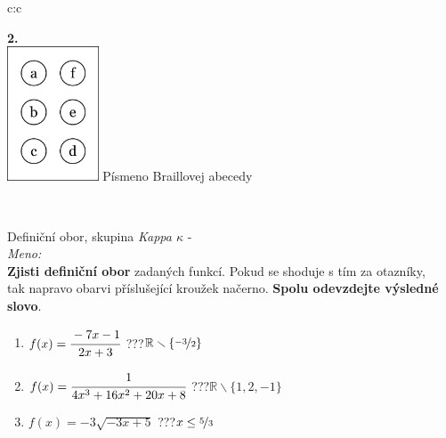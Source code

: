 \documentclass[10pt]{report}
\begin{document}
\begin{tabular}{c:c}
\begin{minipage}[c][99mm][t]{0.49\linewidth}
\begin{center}
\begin{minipage}{0.77\linewidth}
\begin{center}
\begin{varwidth}{\textwidth}
\begin{enumerate}
\end{enumerate}
\end{varwidth}
\end{center}
\end{minipage}
\begin{minipage}{0.20\linewidth}
\begin{center}
{\Huge\bfseries 2.} \\[2mm]
\includegraphics[height=40mm]{../images/braille.png}
{\small Písmeno Braillovej abecedy}
\end{center}
\end{minipage}
\end{center}
\end{minipage}
\\ \hdashline
\begin{minipage}[c][99mm][t]{0.49\linewidth}
\begin{center}
\vspace{7mm}
{\huge Definiční obor, skupina \textit{Kappa $\kappa$} -}\\[4.5mm]
\textit{Meno:}\phantom{xxxxxxxxxxxxxxxxxxxxxxxxxxxxxxxxxxxxxxxxxxxxxxxxxxxxxxxxxxxxxxxxx}\\[3.5mm]
\textbf{Zjisti definiční obor} zadaných funkcí. Pokud se shoduje s tím za otazníky,\\tak napravo obarvi příslušející kroužek načerno. \textbf{Spolu odevzdejte výsledné slovo}.\\[3mm]
\begin{minipage}{0.77\linewidth}
\begin{center}
\begin{varwidth}{\textwidth}
\begin{enumerate}
\normalsize
\item $f(x)=\cfrac{-7x-1}{2x+3}$\quad \dotfill\; ???\;\dotfill \quad $\mathbb{R}\smallsetminus\{\nicefrac{-3}{2}\}$
\item $f(x)=\cfrac{1}{4x^3+16x^2+20x+8}$\quad \dotfill\; ???\;\dotfill \quad $\mathbb{R}\smallsetminus\{1,2,-1\}$
\item $f(x)=-3\sqrt{-3x+5}$\quad \dotfill\; ???\;\dotfill \quad $x\leq\nicefrac{5}{3}$

\end{enumerate}
\end{varwidth}
\end{center}
\end{minipage}
\end{center}
\end{minipage}
\end{tabular}
\end{document}

